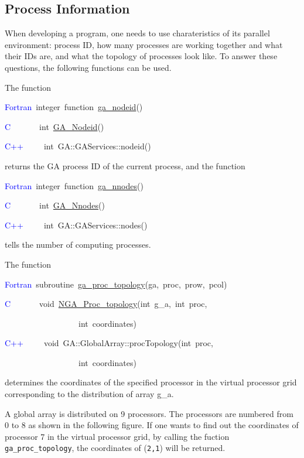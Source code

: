 \subsection{Process Information }

When developing a program, one needs to use charateristics of its
parallel environment: process ID, how many processes are working together
and what their IDs are, and what the topology of processes look like.
To answer these questions, the following functions can be used.

The function

\textcolor{blue}{Fortran}~integer~function~\href{https://hpc.pnl.gov/globalarrays/api/f_op_api.html\#ga_nodeid}{ga\_{}nodeid}()~

\textcolor{blue}{C}~~~~~~~int~\href{https://hpc.pnl.gov/globalarrays/api/c_op_api.html\#ga_nodeid}{GA\_{}Nodeid}()~

\textcolor{blue}{C++~}~~~~int~GA::GAServices::nodeid()

returns the GA process ID of the current process, and the function

\textcolor{blue}{Fortran}~integer~function~\href{https://hpc.pnl.gov/globalarrays/api/f_op_api.html\#ga_nnodes}{ga\_{}nnodes}()~

\textcolor{blue}{C}~~~~~~~int~\href{https://hpc.pnl.gov/globalarrays/api/c_op_api.html\#ga_nnodes}{GA\_{}Nnodes}()~

\textcolor{blue}{C++~}~~~~int~GA::GAServices::nodes()

tells the number of computing processes.

The function

\textcolor{blue}{Fortran~}subroutine~\href{https://hpc.pnl.gov/globalarrays/api/f_op_api.html\#ga_proc_topology}{ga\_{}proc\_{}topology}(ga,~proc,~prow,~pcol)

\textcolor{blue}{C}~~~~~~~void~\href{https://hpc.pnl.gov/globalarrays/api/c_op_api.html\#ga_proc_topology}{NGA\_{}Proc\_{}topology}(int~g\_a,~int~proc,~

~~~~~~~~~~~~~~~~~~int~coordinates)

\textcolor{blue}{C++~}~~~~void~GA::GlobalArray::procTopology(int~proc,~

~~~~~~~~~~~~~~~~~~int~coordinates)

determines the coordinates of the specified processor in the virtual
processor grid corresponding to the distribution of array g\_a.

\textit{\textcolor{black}{}}\textit{\textcolor{black}{{}
}}A global array is distributed on 9 processors. The processors are
numbered from 0 to 8 as shown in the following figure. If one wants
to find out the coordinates of processor 7 in the virtual processor
grid, by calling the fuction \texttt{ga\_proc\_topology}, the coordinates
of (\texttt{2,1}) will be returned.

